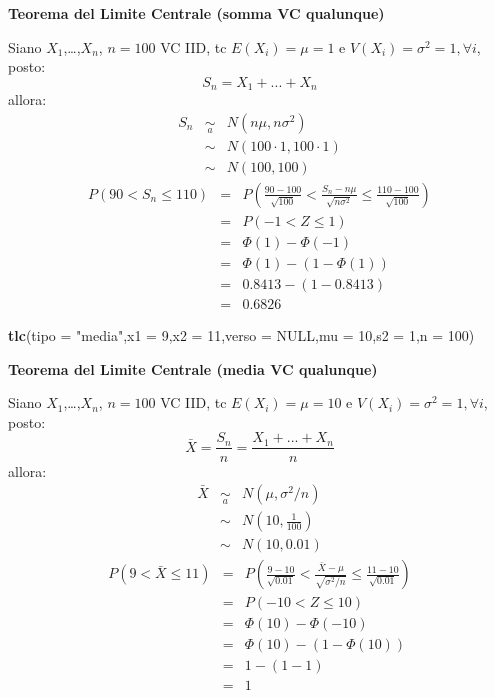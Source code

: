 \documentclass[
  11pt,
]{book}
\newenvironment{Shaded}{\begin{snugshade}}{\end{snugshade}}
\newcommand{\AttributeTok}[1]{\textcolor[rgb]{0.13,0.29,0.53}{#1}}
\newcommand{\ConstantTok}[1]{\textcolor[rgb]{0.56,0.35,0.01}{#1}}
\newcommand{\DecValTok}[1]{\textcolor[rgb]{0.00,0.00,0.81}{#1}}
\newcommand{\FunctionTok}[1]{\textcolor[rgb]{0.13,0.29,0.53}{\textbf{#1}}}
\newcommand{\NormalTok}[1]{#1}
\newcommand{\StringTok}[1]{\textcolor[rgb]{0.31,0.60,0.02}{#1}}
\theoremstyle{mytheoremstyle}
\theoremstyle{mydefstyle}
\begin{document}
\textbf{Teorema del Limite Centrale (somma VC qualunque)}

Siano \(X_1\),\ldots,\(X_n\), \(n=100\) VC IID, tc \(E(X_i)=\mu=1\) e \(V(X_i)=\sigma^2=1,\forall i\), posto:
\[
      S_n = X_1 + ... + X_n
      \]
allora:\begin{eqnarray*}
  S_n & \mathop{\sim}\limits_{a}& N(n\mu,n\sigma^2) \\
     &\sim & N(100\cdot1,100\cdot1) \\
     &\sim & N(100,100) 
  \end{eqnarray*}\begin{eqnarray*}
   P( 90 < S_n \leq  110 ) &=& P\left( \frac { 90  -  100 }{\sqrt{ 100 }} < \frac { S_n  -  n\mu }{ \sqrt{n\sigma^2} } \leq \frac { 110  -  100 }{\sqrt{ 100 }}\right)  \\
              &=& P\left(  -1  < Z \leq  1 \right) \\
              &=& \Phi( 1 )-\Phi( -1 )\\
              &=&  \Phi( 1 )-(1-\Phi( 1 )) \\ &=&  0.8413 -(1- 0.8413 ) \\ 
              &=&  0.6826 
   \end{eqnarray*}

\begin{Shaded}
\begin{Highlighting}[]
\FunctionTok{tlc}\NormalTok{(}\AttributeTok{tipo =} \StringTok{"media"}\NormalTok{,}\AttributeTok{x1 =} \DecValTok{9}\NormalTok{,}\AttributeTok{x2 =} \DecValTok{11}\NormalTok{,}\AttributeTok{verso =} \ConstantTok{NULL}\NormalTok{,}\AttributeTok{mu =} \DecValTok{10}\NormalTok{,}\AttributeTok{s2 =} \DecValTok{1}\NormalTok{,}\AttributeTok{n =} \DecValTok{100}\NormalTok{)}
\end{Highlighting}
\end{Shaded}

\textbf{Teorema del Limite Centrale (media VC qualunque)}

Siano \(X_1\),\ldots,\(X_n\), \(n=100\) VC IID, tc \(E(X_i)=\mu=10\) e \(V(X_i)=\sigma^2=1,\forall i\), posto:
\[
      \bar X=\frac{S_n}n =\frac{X_1 + ... + X_n}n
      \]
allora:\begin{eqnarray*}
  \bar X & \mathop{\sim}\limits_{a}& N(\mu,\sigma^2/n) \\
     &\sim & N\left(10,\frac{1}{100}\right) \\
     &\sim & N(10,0.01)
  \end{eqnarray*}\begin{eqnarray*}
   P( 9 < \bar X \leq  11 ) &=& P\left( \frac { 9  -  10 }{\sqrt{ 0.01 }} < \frac { \bar X  -  \mu }{ \sqrt{\sigma^2/n} } \leq \frac { 11  -  10 }{\sqrt{ 0.01 }}\right)  \\
              &=& P\left(  -10  < Z \leq  10 \right) \\
              &=& \Phi( 10 )-\Phi( -10 )\\
              &=&  \Phi( 10 )-(1-\Phi( 10 )) \\ &=&  1 -(1- 1 ) \\ 
              &=&  1 
   \end{eqnarray*}
\end{document}
